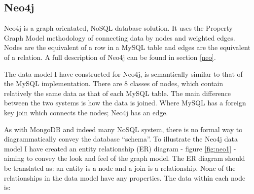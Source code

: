 \subsection{Neo4j}\label{neomodel}
Neo4j is a graph orientated, NoSQL database solution. It uses the Property Graph Model methodology of connecting data by nodes and weighted edges. Nodes are the equivalent of a row in a MySQL table and edges are the equivalent of a relation. A full description of Neo4j can be found in section \ref{neo}.

The data model I have constructed for Neo4j, is semantically similar to that of the MySQL implementation. There are 8 classes of nodes, which contain relatively the same data as that of each MySQL table. The main difference between the two systems is how the data is joined. Where MySQL has a foreign key join which connects the nodes; Neo4j has an edge.

As with MongoDB and indeed many NoSQL system, there is no formal way to diagrammatically convey the database ``schema''. To illustrate the Neo4j data model I have created an entity relationship (ER) diagram - figure \ref{fig:neo1} - aiming to convey the look and feel of the graph model. The ER diagram should be translated as: an entity is a node and a join is a relationship. None of the relationships in the data model have any properties. The data within each node is:

